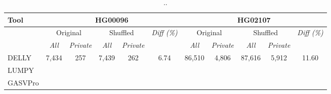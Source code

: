 \begin{table}[htb]
\begin{center}
\begin{tabular}{|l|c|c||c|c||c||c|c||c|c||c|}
\hline
{\bf Tool} & \multicolumn{5}{|c||}{\bf HG00096} & \multicolumn{5}{|c|}{\bf HG02107} \\
\hline
{\bf } & \multicolumn{2}{c||}{Original} & \multicolumn{2}{c||}{Shuffled} & {\it Diff (\%) }
& \multicolumn{2}{c||}{Original} & \multicolumn{2}{c||}{Shuffled} & {\it Diff (\%) } \\
\cline{2-11}
{\bf } & {\it All } & {\it Private } & {\it All } & {\it Private } & {\it }
& {\it All } & {\it Private } &  {\it All } & {\it Private } & {\it }\\
\hline
DELLY & 7,434 & 257 & 7,439 & 262 & 6.74 & 86,510 & 4,806 & 87,616 & 5,912 & 11.60 \\
LUMPY  & & & & & & & & & & \\
GASVPro & & & & & & & & & & \\
\hline
\end{tabular}
\end{center}
\caption{ .. }
\label{tab:dels-orig-vs-shuf}
\end{table}


